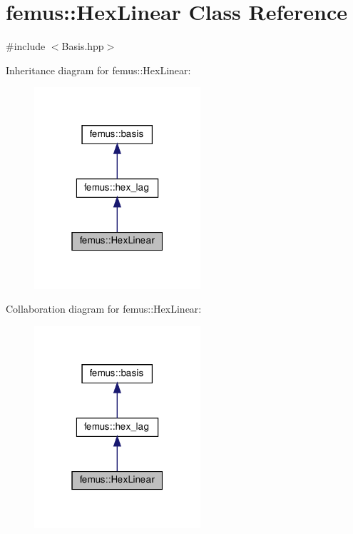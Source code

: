 \hypertarget{classfemus_1_1_hex_linear}{}\section{femus\+:\+:Hex\+Linear Class Reference}
\label{classfemus_1_1_hex_linear}


{\ttfamily \#include $<$Basis.\+hpp$>$}



Inheritance diagram for femus\+:\+:Hex\+Linear\+:
\nopagebreak
\begin{figure}[H]
\begin{center}
\leavevmode
\includegraphics[width=175pt]{classfemus_1_1_hex_linear__inherit__graph}
\end{center}
\end{figure}


Collaboration diagram for femus\+:\+:Hex\+Linear\+:
\nopagebreak
\begin{figure}[H]
\begin{center}
\leavevmode
\includegraphics[width=175pt]{classfemus_1_1_hex_linear__coll__graph}
\end{center}
\end{figure}

